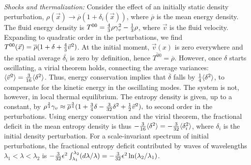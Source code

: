 \documentclass[prl,aps,10pt,twocolumn,showkeys,nofootinbib]{revtex4-1}
\begin{document}
{\it Shocks and thermalization:} Consider the effect of an initially static density perturbation, $\rho(\vec{x})\rightarrow \overline{\rho}\left(1+\delta_i(\vec{x})\right)$, where $\overline{\rho}$ is the mean energy density. The fluid energy density is $T^{00}= {4\over 3} \rho \gamma_{v}^2-{1\over 3} \rho$, where $\vec{v}$ is the fluid velocity.  Expanding to quadratic order in the perturbations, we find $T^{00}(\vec{x})=\overline{\rho}(1+\delta+{4\over 3} \vec{v}^2)$. At the initial moment, $\vec{v}(x)$ is zero everywhere and the spatial average  $\overline{\delta_i}$ is zero by definition, hence $\overline{T^{00}} =\overline{\rho}$. However, once $\delta$ starts oscillating, a virial theorem holds, connecting the average variances: $\langle \vec{v}^2\rangle ={3\over 16}\langle  \delta^2\rangle$. Thus, energy conservation implies that $\overline{\delta}$ falls by ${1\over 4} \langle \delta^2 \rangle$, to compensate for the kinetic energy in the oscillating modes. The system is not, however, in local thermal equilibrium. The entropy density is given, up to a constant, by $\rho^{3\over 4} \gamma_{v}\approx \overline{\rho}^{3\over 4} (1+{3\over 4} \delta -{3\over 32} \delta^2 +{1\over 2} \vec{v}^2),$ to second order in the perturbations. Using energy conservation and the virial theorem, the fractional deficit in the mean entropy density is thus $-{3\over 16} \langle \delta^2 \rangle=-{3\over 32} \langle \delta_i^2 \rangle$, where $\delta_i$ is the initial density perturbation. For a scale-invariant spectrum of initial perturbations, the fractional entropy deficit contributed by waves of wavelengths $\lambda_{1}<\lambda<\lambda_{2}$ is  $-{3\over 32} \epsilon^2 \int_{\lambda_{1}}^{\lambda_{2}}(d\lambda/\lambda)=-{3\over 32} \epsilon^2\ln(\lambda_{2}/\lambda_{1})$. 
 
\end{document}
